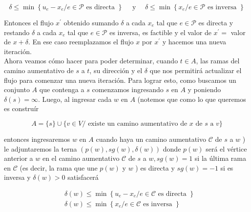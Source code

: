 \documentclass[10pt]{article}
\begin{document}
$$
\delta \leq \min \left\{u_{e}-x_{e} / e \in \mathcal{P} \text { es directa }\right\} \quad \text { y } \quad \delta \leq \min \left\{x_{e} / e \in \mathcal{P} \text { es inversa }\right\}
$$

Entonces el flujo $x^{\prime}$ obtenido sumando $\delta$ a cada $x_{e}$ tal que $e \in \mathcal{P}$ es directa y restando $\delta$ a cada $x_{e}$ tal que $e \in \mathcal{P}$ es inversa, es factible y el valor de $x^{\prime}=$ valor de $x+\delta$. En ese caso reemplazamos el flujo $x$ por $x^{\prime}$ y hacemos una nueva iteración.\\
Ahora veamos cómo hacer para poder determinar, cuando $t \in A$, las ramas del camino aumentativo de $s$ a $t$, su dirección y el $\delta$ que nos permitirá actualizar el flujo para comenzar una nueva iteración. Para lograr esto, como buscamos un conjunto $A$ que contenga a $s$ comenzamos ingresando $s$ en $A$ y poniendo $\delta(s)=\infty$. Luego, al ingresar cada $w$ en $A$ (notemos que como lo que queremos es construír

$$
A=\{s\} \cup\{v \in V / \text { existe un camino aumentativo de } x \text { de } s \text { a } v\}
$$

entonces ingresaremos $w$ en $A$ cuando haya un camino aumentativo $\mathcal{C}$ de $s$ a $w$ ) le adjuntaremos la terna $(p(w), s g(w), \delta(w))$ donde $p(w)$ será el vértice anterior a $w$ en el camino aumentativo $\mathcal{C}$ de $s$ a $w, s g(w)=1$ si la última rama en $\mathcal{C}$ (es decir, la rama que une $p(w)$ y $w$ ) es directa y $s g(w)=-1$ si es inversa y $\delta(w)>0$ satisfacerá

$$
\begin{aligned}
& \delta(w) \leq \min \left\{u_{e}-x_{e} / e \in \mathcal{C} \text { es directa }\right\} \\
& \delta(w) \leq \min \left\{x_{e} / e \in \mathcal{C} \text { es inversa }\right\}
\end{aligned}
$$
\end{document}

